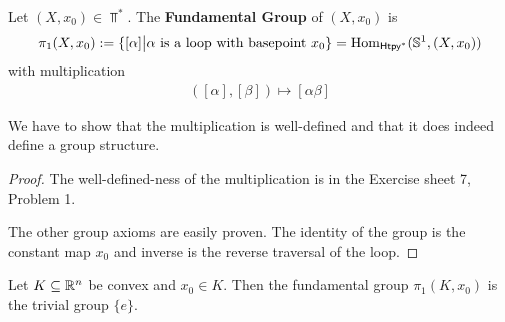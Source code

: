 \begin{dfn}[]
  Let $(X,x_0) \in \Top^{\ast}$.
  The \textbf{Fundamental Group} of $(X,x_0)$ is 
  \begin{align*}
    \pi_1(X,x_0) := \{[\alpha] \big\vert \alpha \text{ is a loop with basepoint $x_0$}\} = \operatorname{Hom}_{\text{\sffamily Htpy}^{\ast}}(\mathbb{S}^{1},(X,x_0))
  \end{align*}
  with multiplication
  \begin{align*}
    ([\alpha],[\beta]) \mapsto [\alpha \beta]
  \end{align*}
\end{dfn}
We have to show that the multiplication is well-defined and that it does indeed define a group structure.
\begin{proof}
  The well-defined-ness of the multiplication is in the Exercise sheet 7, Problem 1.

  The other group axioms are easily proven.
  The identity of the group is the constant map $x_0$ and inverse is the reverse traversal of the loop.
\end{proof}

\begin{ex}[]
Let $K \subseteq \mathbb{R}^{n}$ be convex and $x_0 \in K$. Then the fundamental group $\pi_1(K,x_0)$ is the trivial group $\{e\}$.
\end{ex}

